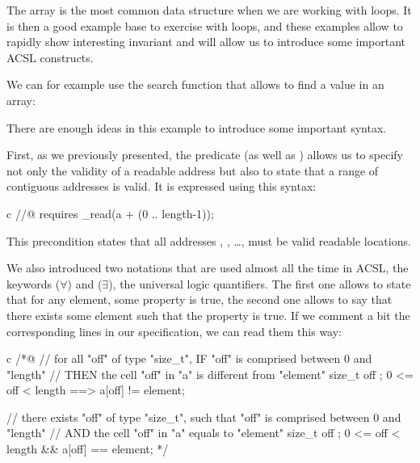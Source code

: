 \label{l3:statements-loops-examples-ro}


The array is the most common data structure when we are working with loops.
It is then a good example base to exercise with loops, and these
examples allow to rapidly show interesting invariant and will allow us
to introduce some important ACSL constructs.



We can for example use the search function that allows to find a value
in an array:





There are enough ideas in this example to introduce some important syntax.



First, as we previously presented, the
 predicate (as well as
) allows us to specify not only the
validity of a readable address but also to state that a range of
contiguous addresses is valid. It is expressed using this syntax:



\begin{CodeBlock}{c}
//@ requires \valid_read(a + (0 .. length-1));
\end{CodeBlock}



This precondition states that all addresses ,
, \ldots{},  must be valid readable
locations.



We also introduced two notations that are used almost all the time in
ACSL, the keywords  ($\forall$) and
 ($\exists$), the universal logic
quantifiers. The first one allows to state that for any element, some
property is true, the second one allows to say that there exists some
element such that the property is true. If we comment a bit the
corresponding lines in our specification, we can read them this way:


\begin{CodeBlock}{c}
/*@
// for all "off" of type "size_t", IF "off" is comprised between 0 and "length"
//                                 THEN the cell "off" in "a" is different from "element"
\forall size_t off ; 0 <= off < length ==> a[off] != element;

// there exists "off" of type "size_t", such that "off" is comprised between 0 and "length"
//                                      AND the cell "off" in "a" equals to "element"
\exists size_t off ; 0 <= off < length && a[off] == element;
*/
\end{CodeBlock}



